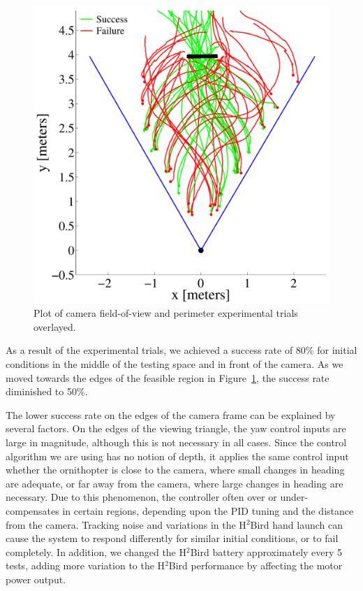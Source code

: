 \documentclass{aamas2013}
\begin{document}
\begin{figure}[tb]
\begin{minipage}[b]{0.45\linewidth}
\includegraphics[width=\textwidth]{figures/flight_paths.pdf}
\caption{Plot of camera field-of-view and perimeter experimental trials overlayed.}
\label{fig:flight_paths}
\end{minipage}
\end{figure}

As a result of the experimental trials, we achieved a success rate of 
80\% for initial conditions in the middle of the testing space and in front 
of the camera. As we moved towards the edges of the feasible region in 
Figure~\ref{fig:flight_paths}, the success rate diminished to 50\%.

The lower success rate on the edges of the camera frame can be explained by
several factors. On the edges of the viewing triangle, the yaw control inputs
are large in magnitude, although this is not necessary in all cases. Since the
control algorithm we are using has no notion of depth, it applies the same
control input whether the ornithopter is close to the camera, where small
changes in heading are adequate, or far away from the camera, where large
changes in heading are necessary. Due to this phenomenon, the controller often
over or under-compensates in certain regions, depending upon the PID tuning
and the distance from the camera. Tracking noise and variations in the
H$^2$Bird hand launch can cause the system to respond differently for similar
initial conditions, or to fail completely. In addition, we changed the
H$^2$Bird battery approximately every 5 tests, adding more variation to the
H$^2$Bird performance by affecting the motor power output.
\end{document}
